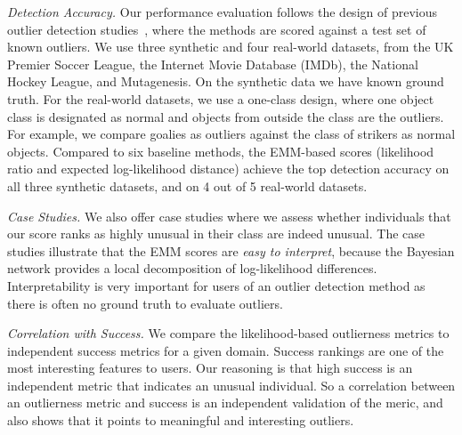 {{\em Detection Accuracy.} Our performance evaluation follows the design of previous outlier detection studies~\cite{Gao2010,aggarwal2013},
where the methods are scored against a test set of known outliers.  
%
We use three synthetic and four real-world datasets, from the UK Premier Soccer League, the Internet Movie Database (IMDb), the National Hockey League, and Mutagenesis. On the synthetic data we have known ground truth. For the real-world datasets, we use a one-class design, where one object class is designated as normal and objects from outside the class are the outliers. For example, we compare goalies as outliers against the class of strikers as normal objects. 
Compared to six baseline methods, the EMM-based scores (likelihood ratio and expected log-likelihood distance) achieve the top detection accuracy on all three synthetic datasets, and on 4 out of 5 real-world datasets.

{\em Case Studies.} We also offer case studies where we assess whether individuals that our score ranks as highly unusual in their class are  indeed unusual. 
The case studies illustrate that the EMM scores are {\em easy to interpret}, because the Bayesian network provides a local decomposition of log-likelihood differences. Interpretability is very important for users of an outlier detection method as there is often no ground truth to 
evaluate outliers.%

{\em Correlation with Success.} We compare the likelihood-based outlierness metrics to independent success metrics for a given domain. Success rankings are one of the most interesting features to users. Our reasoning is that high success is an independent metric that indicates an unusual individual. So a correlation between an outlierness metric and success is an independent validation of the meric, and also shows that it points to meaningful and interesting outliers.

}
